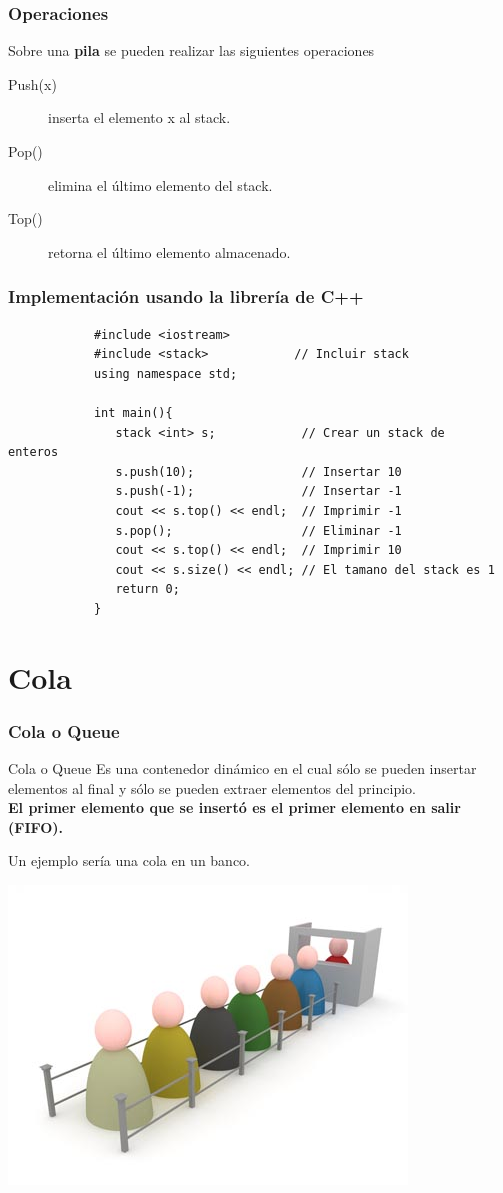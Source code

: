 \documentclass{beamer}
\begin{document}
	\begin{frame}
		\frametitle{Operaciones}
		Sobre una \textbf{pila} se pueden realizar las siguientes
operaciones
		\begin{description}
			\item[Push(x)] inserta el elemento x al stack.
			\item[Pop()] elimina el último elemento del stack.
			\item[Top()] retorna el último elemento almacenado.
		\end{description}
	\end{frame}

	\begin{frame}[fragile]
		\frametitle{Implementación usando la librería de C++}
		\begin{lstlisting}
			#include <iostream>
			#include <stack>            // Incluir stack
			using namespace std;

			int main(){
			   stack <int> s;            // Crear un stack de
enteros
			   s.push(10);               // Insertar 10
			   s.push(-1);               // Insertar -1
			   cout << s.top() << endl;  // Imprimir -1
			   s.pop();                  // Eliminar -1
			   cout << s.top() << endl;  // Imprimir 10
			   cout << s.size() << endl; // El tamano del stack es 1
			   return 0;
			}
		\end{lstlisting}
	\end{frame}

\section{Cola}
	\begin{frame}
		\frametitle{Cola o Queue}
		\begin{block}{Cola o Queue}
			Es una contenedor dinámico en el cual sólo se pueden
insertar elementos al final y sólo se pueden extraer elementos del principio.\\
			\textbf{El primer elemento que se insertó es el primer
elemento en salir (FIFO).}\\
		\end{block}		
		Un ejemplo sería una cola en un banco.\\
		\begin{center}
			\includegraphics[height =
0.4\textheight]{queue_banco.jpg}
		\end{center}
	\end{frame}
\end{document}
